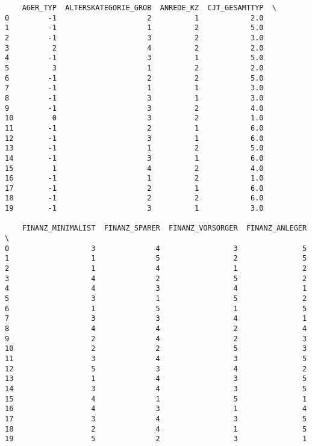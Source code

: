 \documentclass[11pt]{article}
\begin{document}
    
    \begin{verbatim}
    AGER_TYP  ALTERSKATEGORIE_GROB  ANREDE_KZ  CJT_GESAMTTYP  \
0         -1                     2          1            2.0   
1         -1                     1          2            5.0   
2         -1                     3          2            3.0   
3          2                     4          2            2.0   
4         -1                     3          1            5.0   
5          3                     1          2            2.0   
6         -1                     2          2            5.0   
7         -1                     1          1            3.0   
8         -1                     3          1            3.0   
9         -1                     3          2            4.0   
10         0                     3          2            1.0   
11        -1                     2          1            6.0   
12        -1                     3          1            6.0   
13        -1                     1          2            5.0   
14        -1                     3          1            6.0   
15         1                     4          2            4.0   
16        -1                     1          2            1.0   
17        -1                     2          1            6.0   
18        -1                     2          2            6.0   
19        -1                     3          1            3.0   

    FINANZ_MINIMALIST  FINANZ_SPARER  FINANZ_VORSORGER  FINANZ_ANLEGER  \
0                   3              4                 3               5   
1                   1              5                 2               5   
2                   1              4                 1               2   
3                   4              2                 5               2   
4                   4              3                 4               1   
5                   3              1                 5               2   
6                   1              5                 1               5   
7                   3              3                 4               1   
8                   4              4                 2               4   
9                   2              4                 2               3   
10                  2              2                 5               3   
11                  3              4                 3               5   
12                  5              3                 4               2   
13                  1              4                 3               5   
14                  3              4                 3               5   
15                  4              1                 5               1   
16                  4              3                 1               4   
17                  3              4                 3               5   
18                  2              4                 1               5   
19                  5              2                 3               1   


\end{verbatim}
\end{document}
